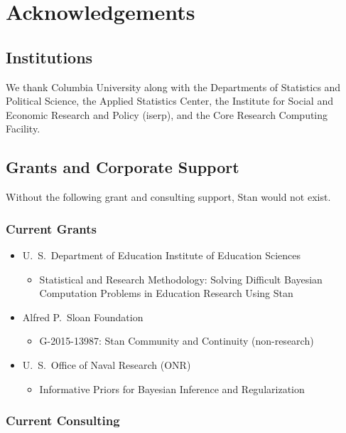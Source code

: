 \chapter*{Acknowledgements}

\section*{Institutions}

We thank Columbia University along with the Departments of
Statistics and Political Science, the Applied Statistics Center, the
Institute for Social and Economic Research and Policy ({\sc iserp}),
and the Core Research Computing Facility.

\section*{Grants and Corporate Support}

Without the following grant and consulting support, Stan would not exist.

\subsection*{Current Grants}

\begin{itemize}
\item 
 U.~S.\ Department of Education Institute of Education Sciences
\begin{itemize}\small
\item Statistical and Research Methodology: Solving
Difficult Bayesian Computation Problems in Education Research Using Stan
\end{itemize}
\item  Alfred P.\ Sloan Foundation
\begin{itemize}\small
\item G-2015-13987: Stan Community and Continuity (non-research)
\end{itemize}
\item U.~S.\ Office of Naval Research (ONR)
\begin{itemize}\small
\item Informative Priors for Bayesian Inference and Regularization
\end{itemize}
\end{itemize}
%

\subsection*{Current Consulting}

